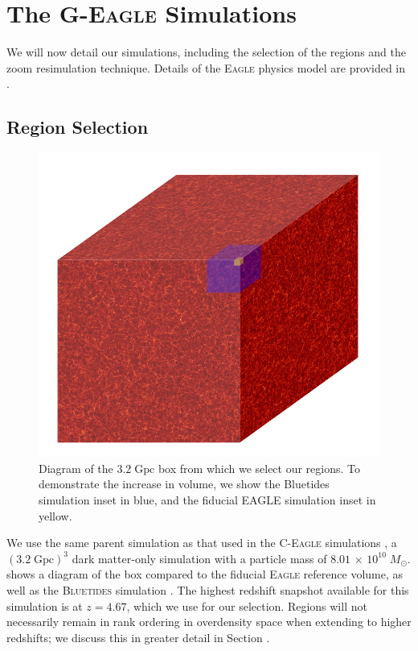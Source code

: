 \section{The \textsc{G-Eagle} Simulations}

We will now detail our simulations, including the selection of the regions and the zoom resimulation technique.
Details of the \textsc{Eagle} physics model are provided in \cite{schaye_eagle_2014,crain_eagle_2015}.

\subsection{Region Selection}

\begin{figure}
	\includegraphics[width=\columnwidth]{images/3D_L3200.png}
    \caption{Diagram of the $3.2 \; \mathrm{Gpc}$ box from which we select our regions. To demonstrate the increase in volume, we show the Bluetides simulation \protect\citep[$L = 500 \;\mathrm{cMpc}$;][]{feng_bluetides_2015} inset in blue, and the fiducial EAGLE simulation \protect\citep[$L = 100 \; \mathrm{cMpc}$;][]{schaye_eagle_2014} inset in yellow.}
    \label{fig:L3200}
\end{figure}

We use the same parent simulation as that used in the \textsc{C-Eagle} simulations \citep{barnes_redshift_2017}, a $(3.2 \; \mathrm{Gpc})^3$ dark matter-only simulation with a particle mass of $8.01 \,\times\, 10^{10} \; M_{\odot}$.
 shows a diagram of the box compared to the fiducial \textsc{Eagle} reference volume, as well as the \textsc{Bluetides} simulation \citep{feng_bluetides_2015}.
The highest redshift snapshot available for this simulation is at $z = 4.67$, which we use for our selection.
Regions will not necessarily remain in rank ordering in overdensity space when extending to higher redshifts; we discuss this in greater detail in Section .

